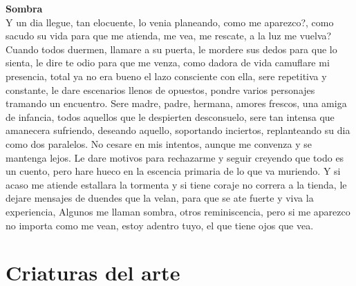 \documentclass[12pt, a4paper, twoside]{book} %
\begin{document}
\noindent\textbf{Sombra}\\
Y un dia llegue, tan elocuente, lo venia planeando, como me aparezco?, como sacudo su vida para que me atienda, me vea, me rescate, a la luz me vuelva?
Cuando todos duermen, llamare a su puerta, le mordere sus dedos para que lo sienta, le dire te odio para que me venza, como dadora de vida camuflare mi presencia, total ya no era bueno el lazo consciente con ella, sere repetitiva y constante, le dare escenarios llenos de opuestos, pondre varios personajes tramando  un encuentro.
Sere madre, padre, hermana, amores frescos, una amiga de infancia, todos aquellos que le despierten desconsuelo, sere tan intensa que amanecera sufriendo, deseando aquello, soportando inciertos, replanteando su dia como dos paralelos.
No cesare en mis intentos, aunque me convenza y se mantenga lejos.
Le dare motivos para rechazarme y seguir creyendo que todo es un cuento, pero hare hueco en la escencia primaria de lo que va muriendo.
Y si acaso me atiende estallara la tormenta y si tiene coraje no correra a la tienda, le dejare mensajes de duendes que la velan, para que se ate fuerte y viva la experiencia,
Algunos me llaman sombra, otros reminiscencia, pero si me aparezco no importa como me vean, estoy adentro tuyo, el que tiene ojos que vea.

\chapter{Criaturas del arte}
\end{document}
